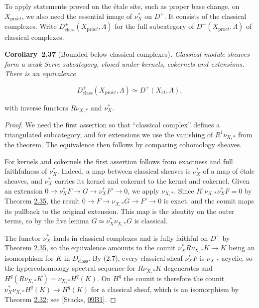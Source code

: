 \documentclass[11pt]{article}
\newenvironment{bpstatement}[2]{\par\addvspace{0.6\baselineskip}\noindent\textbf{#1}#2\textbf{.}\enspace\ignorespaces}
  {\par\addvspace{0.4\baselineskip}}
\newenvironment{bpstatementit}[2]{\begin{bpstatement}{#1}{#2}\itshape\ignorespaces}{\end{bpstatement}}
\begin{document}
\label{bp106}%
To apply statements proved on the étale site, such as proper base change, on \(X_{\mathrm{pro}\acute{e}t}\), we also need the essential image of \(\nu_X^*\) on \(D^+\). It consists of the classical complexes. Write \(D^+_{\mathrm{class}}(X_{\mathrm{pro}\acute{e}t},\Lambda)\) for the full subcategory of \(D^+(X_{\mathrm{pro}\acute{e}t},\Lambda)\) of classical complexes.

\label{bp107}%
\begin{bpstatementit}{Corollary~2.37}{ (Bounded-below classical complexes)}
Classical module sheaves form a weak Serre subcategory, closed under kernels, cokernels and extensions. There is an equivalence

\[
D^+_{\mathrm{class}}(X_{\mathrm{pro}\acute{e}t},\Lambda)
\simeq D^+(X_{\acute{e}t},\Lambda),
\]

with inverse functors \(R\nu_{X,*}\) and \(\nu_X^*\).
\end{bpstatementit}

\begin{proof}[{Proof}]\label{bp108}%
We need the first assertion so that “classical complex” defines a triangulated subcategory, and for extensions we use the vanishing of \(R^1\nu_{X,*}\) from the theorem. The equivalence then follows by comparing cohomology sheaves.

For kernels and cokernels the first assertion follows from exactness and full faithfulness of \(\nu_X^*\). Indeed, a map between classical sheaves is \(\nu_X^*\) of a map of étale sheaves, and \(\nu_X^*\) carries its kernel and cokernel to the kernel and cokernel. Given an extension \(0\to\nu_X^*F\to G\to\nu_X^*F'\to0\), we apply \(\nu_{X,*}\). Since \(R^1\nu_{X,*}\nu_X^*F=0\) by Theorem \hyperref[bp101]{2.35}, the result \(0\to F\to\nu_{X,*}G\to F'\to0\) is exact, and the counit maps its pullback to the original extension. This map is the identity on the outer terms, so by the five lemma \(G\simeq\nu_X^*\nu_{X,*}G\) is classical.

The functor \(\nu_X^*\) lands in classical complexes and is fully faithful on \(D^+\) by Theorem \hyperref[bp101]{2.35}, so the equivalence amounts to the counit \(\nu_X^*R\nu_{X,*}K\to K\) being an isomorphism for \(K\) in \(D^+_{\mathrm{class}}\). By (2.7), every classical sheaf \(\nu_X^*F\) is \(\nu_{X,*}\)-acyclic, so the hypercohomology spectral sequence for \(R\nu_{X,*}K\) degenerates and \(H^q(R\nu_{X,*}K)=\nu_{X,*}H^q(K)\). On \(H^q\) the counit is therefore the counit \(\nu_X^*\nu_{X,*}H^q(K)\to H^q(K)\) for a classical sheaf, which is an isomorphism by Theorem \hyperref[bp93]{2.32}; see [Stacks, \href{https://stacks.math.columbia.edu/tag/09B1}{09B1}].
\end{proof}
\end{document}

